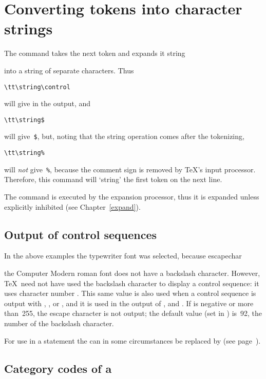 \section{Converting tokens into character strings}

The command  takes the next token and expands it
\cstoidx string\par
into a string of separate characters. Thus
\begin{verbatim}
\tt\string\control
\end{verbatim}
will give  in the
output, and
\begin{verbatim}
\tt\string$
\end{verbatim}
will give~\verb-$-, but, noting that the string 
operation comes after the tokenizing,
\begin{verbatim}
\tt\string%
\end{verbatim}
will {\em not\/} give~\verb$%$,
because the comment
sign is removed by \TeX's input processor.
Therefore, this command will `string' the first token on the next line.

The  command is executed by the expansion processor, thus
it is expanded unless explicitly inhibited (see Chapter~\ref{expand}).

\subsection{Output of control sequences}

In the above examples the typewriter font was selected, because
\cstoidx escapechar\par
the Computer Modern roman font does not have a backslash character.
However,
\TeX\ need not have used the backslash character to display
a control sequence: it uses character number .
This same value is also used when a control sequence is
output with , , or ,
and it is used in the output of ,  and .
If  is negative or more than~255,
the escape character is not
output; the default value (set in \IniTeX) is~92, the number
of the backslash character.

For use in a   statement the  can 
in some circumstances be
replaced  by  (see page~\pageref{expand:write}).

\subsection{Category codes of a }

